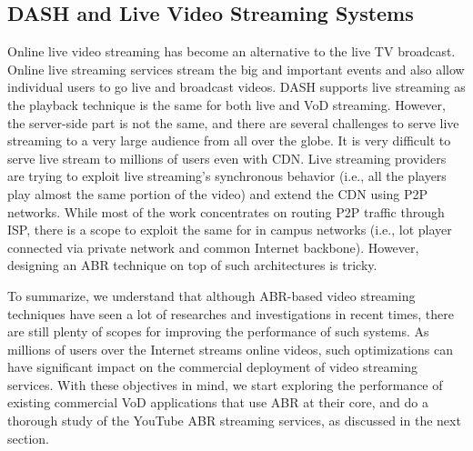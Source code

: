 \subsection{DASH and Live Video Streaming Systems}
Online live video streaming has become an alternative to the live TV broadcast. Online live streaming services stream the big and important events and also allow individual users to go live and broadcast videos. DASH supports live streaming as the playback technique is the same for both live and VoD streaming. However, the server-side part is not the same, and there are several challenges to serve live streaming to a very large audience from all over the globe. It is very difficult to serve live stream to millions of users even with CDN. Live streaming providers are trying to exploit live streaming's synchronous behavior (i.e., all the players play almost the same portion of the video) and extend the CDN using P2P networks. While most of the work concentrates on routing P2P traffic through ISP, there is a scope to exploit the same for in campus networks (i.e., lot player connected via private network and common Internet backbone). However, designing an ABR technique on top of such architectures is tricky.

To summarize, we understand that although ABR-based video streaming techniques have seen a lot of researches and investigations in recent times, there are still plenty of scopes for improving the performance of such systems. As millions of users over the Internet streams online videos, such optimizations can have significant impact on the commercial deployment of video streaming services. With these objectives in mind, we start exploring the performance of existing commercial VoD applications that use ABR at their core, and do a thorough study of the YouTube ABR streaming services, as discussed in the next section.
